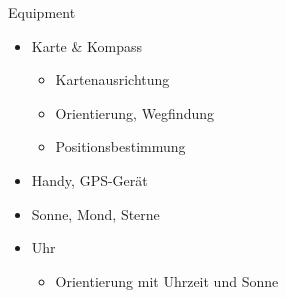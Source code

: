 \documentclass{beamer}
\begin{document}
			\begin{frame}{Equipment}
				\begin{minipage}{0.59\textwidth}
					\begin{itemize}
						\item<1-> Karte \& Kompass
						\begin{itemize}
							\item Kartenausrichtung
							\item Orientierung, Wegfindung
							\item Positionsbestimmung
						\end{itemize}
						\item<2-> Handy, GPS-Gerät
						\item<3-> Sonne, Mond, Sterne
						\item<3-> Uhr
						\begin{itemize}
							\item Orientierung mit Uhrzeit und Sonne
						\end{itemize}
					\end{itemize}
				\end{minipage}
				\begin{minipage}{0.39\textwidth}
				\end{minipage}
			\end{frame}
	
\end{document}
